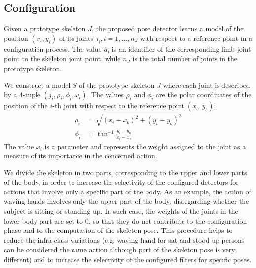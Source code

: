 \documentclass[runningheads,a4paper]{llncs}
\begin{document}


\subsection{Configuration}
Given a prototype skeleton $J$, the proposed pose detector learns a model of the position $(x_i,y_i)$  of its joints $j_i, i=1, \dots, n_J$ with respect to a reference point in a configuration process. The value $a_i$ is an identifier of the corresponding limb joint point to the skeleton joint point, while $n_J$ is the total number of joints in the prototype skeleton.

We construct a model $S$ of the prototype skeleton $J$ where each joint is described by  a $4$-tuple $(j_i, \rho_i, \phi_i, \omega_{i})$. The values  $\rho_i$ and $\phi_i$ are the polar coordinates of the position of the $i$-th joint with respect to the reference point $(x_b, y_b)$:
\begin{align}
\rho_i &= \sqrt{(x_i-x_b)^2 + (y_i-y_b)^2}\\
\phi_i &= \tan^{-1} \frac{y_i-y_b}{x_i-x_b}
\end{align}
The value $\omega_i$ is a parameter and represents the weight assigned to the joint as a measure of its importance in the concerned action. 

We divide the skeleton in two parts, corresponding to the upper and lower parts of the body, in order to increase the selectivity of the configured detectors for actions that involve only a specific part of the body. As an example, the action of waving hands involves only the upper part of the body, disregarding whether the subject is sitting or standing up. In such case, the weights of the joints in the lower body part are set to $0$, so that they do not contribute to the configuration phase and to the computation of the skeleton pose. This procedure helps to reduce the infra-class variations (e.g. waving hand for sat and stood up persons can be considered the same action although part of the skeleton pose is very different) and to increase the selectivity of the configured filters for specific poses. 
\end{document}
